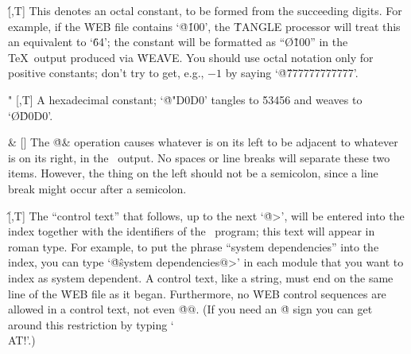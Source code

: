 \@\' [\PAS,T] This denotes an octal constant, to be formed from the
succeeding digits.
For example, if the \.{WEB} file contains `\.{@\'100}',
the \.{TANGLE} processor will treat this an equivalent to `\.{64}';
the constant will be formatted as ``\O{\~100}'' in the \TeX\ output
produced via \.{WEAVE}.
You should use octal notation only for positive
constants; don't try to get, e.g., $-1$ by saying `\.{@\'777777777777}'.

\@" [\PAS,T] A hexadecimal constant; `\.{@"D0D0}' tangles to \.{53456} and
weaves to `\O{\^D0D0}'.


%

\@\& [\PAS] The \.{@\&} operation causes whatever is on its left to be
adjacent to whatever is on its right, in the \PASCAL\ output.
No spaces or
line breaks will separate these two items.
However, the thing on the left
should not be a semicolon, since a line break might occur after a semicolon.

\@\^ [\PAS,T] The ``control text'' that follows, up to the next
`\.{@>}', will be entered into the index together with the identifiers of
the \PASCAL\ program; this text will appear in roman type.
For example, to
put the phrase ``system dependencies'' into the index, you can type
`\.{@\^system dependencies@>}' in each module
that you want to index as system dependent.
A control text, like a string,
must end on the same line of the \.{WEB} file as it began.
Furthermore,
no \.{WEB} control sequences are allowed in a control text, not even
\.{@@}.
(If you need an \.{@} sign you can get around this restriction by
typing `\.{\\AT!}'.)


